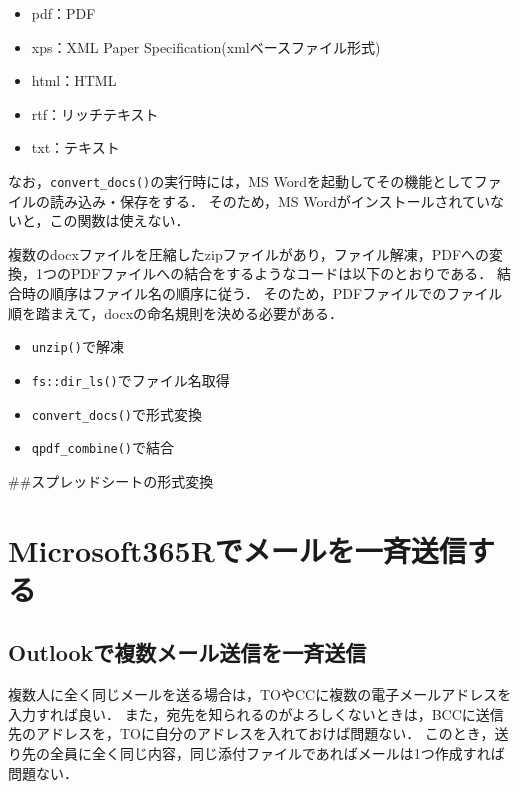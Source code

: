 \documentclass[
]{article}
\providecommand{\tightlist}{%
  \setlength{\itemsep}{0pt}\setlength{\parskip}{0pt}}
\begin{document}
\begin{itemize}
\tightlist
\item
  pdf：PDF
\item
  xps：XML Paper Specification(xmlベースファイル形式)\\
\item
  html：HTML\\
\item
  rtf：リッチテキスト\\
\item
  txt：テキスト
\end{itemize}

なお，\texttt{convert\_docs()}の実行時には，MS Wordを起動してその機能としてファイルの読み込み・保存をする．
そのため，MS Wordがインストールされていないと，この関数は使えない．

複数のdocxファイルを圧縮したzipファイルがあり，ファイル解凍，PDFへの変換，1つのPDFファイルへの結合をするようなコードは以下のとおりである．
結合時の順序はファイル名の順序に従う．
そのため，PDFファイルでのファイル順を踏まえて，docxの命名規則を決める必要がある．

\begin{itemize}
\tightlist
\item
  \texttt{unzip()}で解凍\\
\item
  \texttt{fs::dir\_ls()}でファイル名取得\\
\item
  \texttt{convert\_docs()}で形式変換\\
\item
  \texttt{qpdf\_combine()}で結合
\end{itemize}

\#\#スプレッドシートの形式変換

\hypertarget{microsoft365r}{%
\section{Microsoft365Rでメールを一斉送信する}\label{microsoft365r}}

\hypertarget{outlookux3067ux8907ux6570ux30e1ux30fcux30ebux9001ux4fe1ux3092ux4e00ux6589ux9001ux4fe1}{%
\subsection{Outlookで複数メール送信を一斉送信}\label{outlookux3067ux8907ux6570ux30e1ux30fcux30ebux9001ux4fe1ux3092ux4e00ux6589ux9001ux4fe1}}

複数人に全く同じメールを送る場合は，TOやCCに複数の電子メールアドレスを入力すれば良い．
また，宛先を知られるのがよろしくないときは，BCCに送信先のアドレスを，TOに自分のアドレスを入れておけば問題ない．
このとき，送り先の全員に全く同じ内容，同じ添付ファイルであればメールは1つ作成すれば問題ない．
\end{document}
